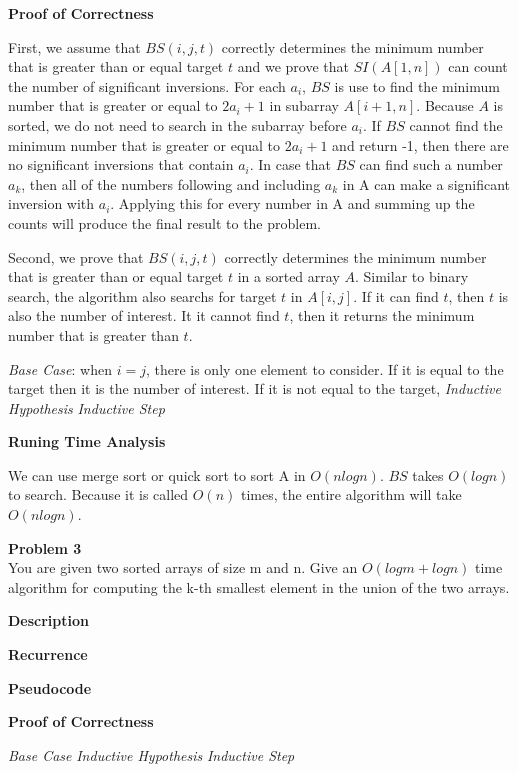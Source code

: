 \documentclass[12pt,article]{article}
\newenvironment{problem}[2][Problem]
    { \begin{mdframed}[backgroundcolor=gray!20] \textbf{#1 #2} \\}
    {  \end{mdframed}}
\begin{document}
\textbf{Proof of Correctness}

First, we assume that $BS(i,j,t)$ correctly determines the minimum number that is greater than or equal target $t$ and we prove that $SI(A[1,n])$ can count the number of significant inversions. For each $a_i$, $BS$ is use to find the minimum number that is greater or equal to $2a_i + 1$ in subarray $A[i+1,n]$. Because $A$ is sorted, we do not need to search in the subarray before $a_i$. If $BS$ cannot find the minimum number that is greater or equal to $2a_i + 1$ and return -1, then there are no significant inversions that contain $a_i$. In case that $BS$ can find such a number $a_k$, then all of the numbers following and including $a_k$ in A can make a significant inversion with $a_i$. Applying this for every number in A and summing up the counts will produce the final result to the problem.

Second, we prove that $BS(i,j,t)$ correctly determines the minimum number that is greater than or equal target $t$ in a sorted array $A$. Similar to binary search, the algorithm also searchs for target $t$ in $A[i,j]$. If it can find $t$, then $t$ is also the number of interest. It it cannot find $t$, then it returns the minimum number that is greater than $t$. 

\textit{Base Case}: when $i = j$, there is only one element to consider. If it is equal to the target then it is the number of interest. If it is not equal to the target, 
\textit{Inductive Hypothesis}
\textit{Inductive Step}

\textbf{Runing Time Analysis}

We can use merge sort or quick sort to sort A in $O(nlogn)$. $BS$ takes $O(logn)$ to search. Because it is called $O(n)$ times, the entire algorithm will take $O(nlogn)$.
\newpage
\begin{problem}{3} 
You are given two sorted arrays of size m and n. Give an $O(logm + logn)$ time algorithm for computing the k-th smallest element in the union of the two arrays.
\end{problem}

\textbf{Description}

\textbf{Recurrence}


\textbf{Pseudocode}


\textbf{Proof of Correctness}

\textit{Base Case}
\textit{Inductive Hypothesis}
\textit{Inductive Step}
\end{document}
